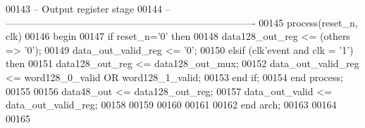 \begin{DoxyCode}
00143 \textcolor{keyword}{-- Output register stage}
00144 \textcolor{keyword}{-- ----------------------------------------------------------------------------                  }
00145   \textcolor{keywordflow}{process}(reset_n, clk)
00146 \textcolor{vhdlkeyword}{    begin}
00147       \textcolor{keywordflow}{if} \textcolor{vhdlchar}{reset_n}\textcolor{vhdlchar}{=}\textcolor{vhdlchar}{'}\textcolor{vhdllogic}{}\textcolor{vhdllogic}{0}\textcolor{vhdlchar}{'} \textcolor{keywordflow}{then}
00148          \textcolor{vhdlchar}{data128_out_reg}      \textcolor{vhdlchar}{<=} \textcolor{vhdlchar}{(}\textcolor{keywordflow}{others} \textcolor{vhdlchar}{=}\textcolor{vhdlchar}{>} \textcolor{vhdlchar}{'}\textcolor{vhdllogic}{}\textcolor{vhdllogic}{0}\textcolor{vhdlchar}{'}\textcolor{vhdlchar}{)};
00149             \textcolor{vhdlchar}{data_out_valid_reg}   \textcolor{vhdlchar}{<=} \textcolor{vhdlchar}{'}\textcolor{vhdllogic}{}\textcolor{vhdllogic}{0}\textcolor{vhdlchar}{'};        
00150       \textcolor{keywordflow}{elsif} \textcolor{vhdlchar}{(}\textcolor{vhdlchar}{clk}\textcolor{vhdlchar}{'}\textcolor{vhdlkeyword}{event} \textcolor{keywordflow}{and} \textcolor{vhdlchar}{clk} \textcolor{vhdlchar}{=} \textcolor{vhdlchar}{'}\textcolor{vhdllogic}{}\textcolor{vhdllogic}{1}\textcolor{vhdlchar}{'}\textcolor{vhdlchar}{)} \textcolor{keywordflow}{then}
00151          \textcolor{vhdlchar}{data128_out_reg}      \textcolor{vhdlchar}{<=} \textcolor{vhdlchar}{data128_out_mux}; 
00152             \textcolor{vhdlchar}{data_out_valid_reg}   \textcolor{vhdlchar}{<=} \textcolor{vhdlchar}{word128_0_valid} \textcolor{keywordflow}{OR} \textcolor{vhdlchar}{word128_1_valid};
00153         \textcolor{keywordflow}{end} \textcolor{keywordflow}{if};
00154     \textcolor{keywordflow}{end} \textcolor{keywordflow}{process};
00155     
00156 \textcolor{vhdlchar}{data48_out}     \textcolor{vhdlchar}{<=} \textcolor{vhdlchar}{data128_out_reg};
00157 \textcolor{vhdlchar}{data_out_valid} \textcolor{vhdlchar}{<=} \textcolor{vhdlchar}{data_out_valid_reg};
00158 
00159 
00160  
00161 
00162 \textcolor{keywordflow}{end} \textcolor{vhdlchar}{arch};   
00163 
00164 
00165 
\end{DoxyCode}
